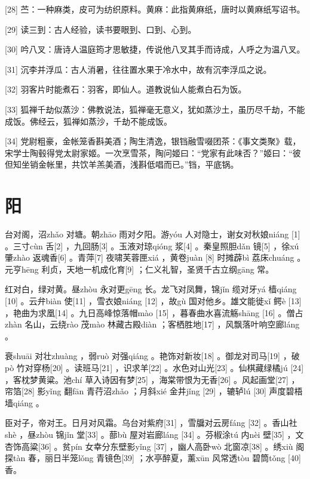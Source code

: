 \documentclass[12pt,UTF8]{ctexbook}
\begin{document}
[28] 苎：一种麻类，皮可为纺织原料。黄麻：此指黄麻纸，唐时以黄麻纸写诏书。

[29] 读三到：古人经验，读书要眼到、口到、心到。

[30] 吟八叉：唐诗人温庭筠才思敏捷，传说他八叉其手而诗成，人呼之为温八叉。

[31] 沉李并浮瓜：古人消暑，往往置水果于冷水中，故有沉李浮瓜之说。

[32] 羽客片时能煮石：羽客，即仙人。道教说仙人能煮白石为饭。

[33] 狐禅千劫似蒸沙：佛教说法，狐禅毫无意义，犹如蒸沙土，虽历尽千劫，不能成饭。佛经云，狐禅如蒸沙，千劫不能成饭。

[34] 党尉粗豪，金帐笼香斟美酒；陶生清逸，银铛融雪啜团茶：《事文类聚》载，宋学士陶毂得党太尉家姬。一次烹雪茶，陶问姬曰：“党家有此味否？”姬曰：“彼但知坐销金帐里，共饮羊羔美酒，浅斟低唱而已。”铛，平底锅。





\chapter{阳}


台对阁，沼zhǎo 对塘。朝zhāo 雨对夕阳。游yóu 人对隐士，谢女对秋娘niáng [1] 。三寸cùn 舌[2] ，九回肠[3] 。玉液对琼qióng 浆[4] 。秦皇照胆dǎn 镜[5] ，徐xú 肇zhào 返魂香[6] 。青萍[7] 夜啸芙蓉匣xiá ，黄卷juàn [8] 时摊薜bì 荔床chuáng 。元亨hēng 利贞，天地一机成化育[9] ；仁义礼智，圣贤千古立纲gāng 常。

红对白，绿对黄。昼zhòu 永对更gēng 长。龙飞对凤舞，锦jǐn 缆对牙yá 樯qiáng [10] 。云弁biàn 使[11] ，雪衣娘niáng [12] ，故gù 国对他乡。雄文能徙xǐ 鳄è [13] ，艳曲为求凰[14] 。九日高峰惊落帽mào [15] ，暮春曲水喜流觞shāng [16] 。僧占zhàn 名山，云绕rào 茂mào 林藏古殿diàn ；客栖胜地[17] ，风飘落叶响空廊láng 。

衰shuāi 对壮zhuàng ，弱ruò 对强qiáng 。艳饰对新妆[18] 。御龙对司马[19] ，破pò 竹对穿杨[20] 。读班马[21] ，识求羊[22] 。水色对山光[23] 。仙棋藏绿橘jú [24] ，客枕梦黄粱。池chí 草入诗因有梦[25] ，海棠带恨为无香[26] 。风起画堂[27] ，帘箔[28] 影yǐng 翻fān 青荇沼zhǎo ；月斜xié 金井jǐng [29] ，辘轳lú [30] 声度碧梧墙qiáng 。

臣对子，帝对王。日月对风霜。乌台对紫府[31] ，雪牖对云房fáng [32] 。香山社shè ，昼zhòu 锦jǐn 堂[33] 。蔀bù 屋对岩廊láng [34] 。芬椒涂tú 内nèi 壁[35] ，文杏饰高粱[36] 。贫pín 女幸分东壁影yǐng [37] ，幽人高卧wò 北窗凉[38] 。绣xiù 阁探tàn 春，丽日半笼lǒng 青镜色[39] ；水亭醉夏，薰xūn 风常透tòu 碧筒tǒng [40] 香。
\end{document}
